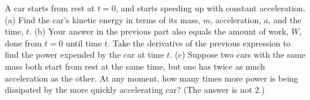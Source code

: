 A car starts from rest at $t=0$, and starts speeding
up with constant acceleration. (a) Find the car's kinetic
energy in terms of its mass, $m$, acceleration, $a$, and the
time, $t$. (b) Your answer in the previous part also equals
the amount of work, $W$, done from $t=0$ until time $t$.
Take the derivative of the previous expression to find the
power expended by the car at time $t$. (c) Suppose two cars
with the same mass both start from rest at the same time,
but one has twice as much acceleration as the other. At any
moment, how many times more power is being dissipated by the
more quickly accelerating car? (The answer is not 2.)
\answercheck
